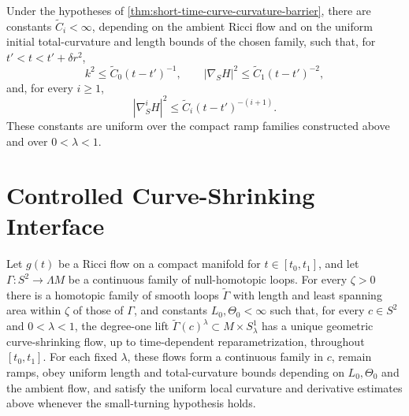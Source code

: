 \begin{theorem}
\label{thm:curve-shrinking-derivative-estimates}
\notready
Under the hypotheses of \ref{thm:short-time-curve-curvature-barrier}, there
are constants
$\widetilde C_i<\infty$, depending on the ambient Ricci flow and on the
uniform initial total-curvature and length bounds of the chosen family, such
that, for $t'<t<t'+\delta r^2$,
\[
 k^2\le \widetilde C_0(t-t')^{-1},\qquad
 |\nabla_SH|^2\le\widetilde C_1(t-t')^{-2},
\]
and, for every $i\ge1$,
\[
 |\nabla_S^iH|^2\le\widetilde C_i(t-t')^{-(i+1)}.
\]
These constants are uniform over the compact ramp families constructed
above and over $0<\lambda<1$.
\end{theorem}

\section{Controlled Curve-Shrinking Interface}

\begin{theorem}
\label{thm:controlled-curve-shrinking-existence}
\notready
Let $g(t)$ be a Ricci flow on a compact manifold for
$t\in[t_0,t_1]$, and let
$\Gamma\colon S^2\to\Lambda M$ be a continuous family of null-homotopic
loops.  For every $\zeta>0$ there is a homotopic family of smooth loops
$\widetilde\Gamma$ with length and least spanning area within $\zeta$ of
those of $\Gamma$, and constants $L_0,\Theta_0<\infty$ such that, for every
$c\in S^2$ and $0<\lambda<1$, the degree-one lift
$\widetilde\Gamma(c)^\lambda\subset M\times S^1_\lambda$ has a unique
geometric curve-shrinking flow, up to time-dependent reparametrization,
throughout $[t_0,t_1]$.  For each fixed $\lambda$, these flows form a
continuous family in $c$, remain ramps, obey uniform length and
total-curvature bounds depending
on $L_0,\Theta_0$ and the ambient flow, and satisfy the uniform local
curvature and derivative estimates above whenever the small-turning
hypothesis holds.
\end{theorem}

